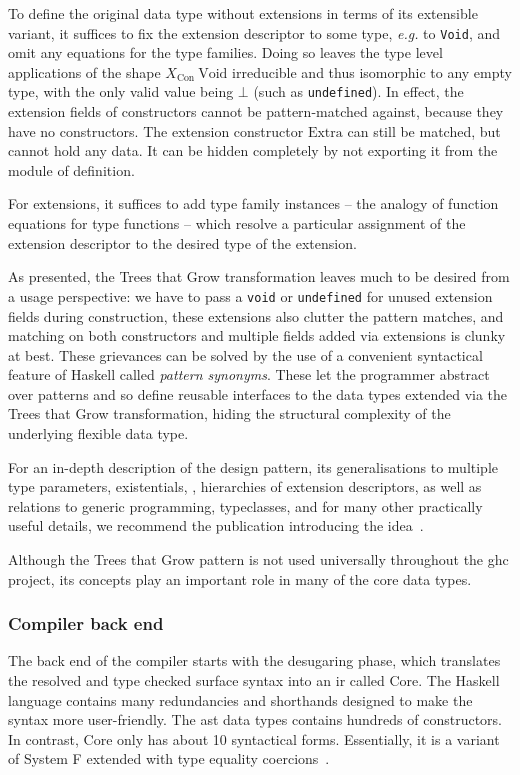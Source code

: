 \documentclass[thesis=B,english]{FITthesis}[2019/12/23]
\newcommand{\eg}{\emph{e.g.}\xspace}
\newcommand{\hsType}[1]{\texttt{#1}}
\newcommand{\hsIdent}[1]{\texttt{#1}}
\begin{document}
\begin{tcolorbox}[parbox=false, breakable, title=Trees that Grow]
To define the original data type without extensions in terms of its extensible
variant, it suffices to fix the extension descriptor to some type, \eg to
\hsType{Void}, and omit any equations for the type families. Doing so leaves
the type level applications of the shape $X_{\mathrm{Con}}~\mathrm{Void}$
irreducible and thus isomorphic to any empty type, with the only valid value
being $\bot$ (such as \hsIdent{undefined}). In effect, the extension fields of
constructors cannot be pattern-matched against, because they have no
constructors. The extension constructor $\mathrm{Extra}$ can still be matched,
but cannot hold any data. It can be hidden completely by not exporting it from
the module of definition.

For extensions, it suffices to add type family instances -- the analogy of
function equations for type functions -- which resolve a particular assignment
of the extension descriptor to the desired type of the extension.

As presented, the Trees that Grow transformation leaves much to be desired from
a usage perspective: we have to pass a \hsIdent{void} or \hsIdent{undefined}
for unused extension fields during construction, these extensions also clutter
the pattern matches, and matching on both constructors and multiple fields
added via extensions is clunky at best. These grievances can be solved by the
use of a convenient syntactical feature of Haskell called \textit{pattern
synonyms}\cite{pattern-synonyms}. These let the programmer abstract over
patterns and so define reusable interfaces to the data types extended via the
Trees that Grow transformation, hiding the structural complexity of the
underlying flexible data type.

For an in-depth description of the design pattern, its generalisations to
multiple type parameters, existentials, , hierarchies of
extension descriptors, as well as relations to generic programming,
typeclasses, and for many other practically useful details, we recommend the
publication introducing the idea~\cite{trees-that-grow}.

Although the Trees that Grow pattern is not used universally throughout the
\acrshort{ghc} project, its concepts play an important role in many of the core
data types.
\end{tcolorbox}

\subsubsection*{Compiler back end}
The back end of the compiler starts with the desugaring phase, which translates
the resolved and type checked surface syntax into an \acrfull{ir} called Core.
The Haskell language contains many redundancies and shorthands designed to make
the syntax more user-friendly. The \acrshort{ast} data types contains hundreds
of constructors. In contrast, Core only has about 10 syntactical forms.
Essentially, it is a variant of System F extended with type equality
coercions~\cite{system-fc}.
\end{document}

